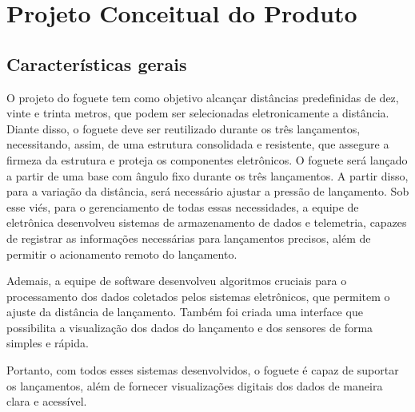 \chapter{Projeto Conceitual do Produto}

\section{Características gerais}

 O projeto do foguete tem como objetivo alcançar distâncias predefinidas de dez, vinte e trinta metros, que podem ser selecionadas eletronicamente a distância. Diante disso, o foguete deve ser reutilizado durante os três lançamentos, necessitando, assim, de uma estrutura consolidada e resistente, que assegure a firmeza da estrutura e proteja os componentes eletrônicos. O foguete será lançado a partir de uma base com ângulo fixo durante os três lançamentos. A partir disso, para a variação da distância, será necessário ajustar a pressão de lançamento. Sob esse viés, para o gerenciamento de todas essas necessidades, a equipe de eletrônica desenvolveu sistemas de armazenamento de dados e telemetria, capazes de registrar as informações necessárias para lançamentos precisos, além de permitir o acionamento remoto do lançamento.

Ademais, a equipe de software desenvolveu algoritmos cruciais para o processamento dos dados coletados pelos sistemas eletrônicos, que permitem o ajuste da distância de lançamento. Também foi criada uma interface que possibilita a visualização dos dados do lançamento e dos sensores de forma simples e rápida.

Portanto, com todos esses sistemas desenvolvidos, o foguete é capaz de suportar os lançamentos, além de fornecer visualizações digitais dos dados de maneira clara e acessível.



